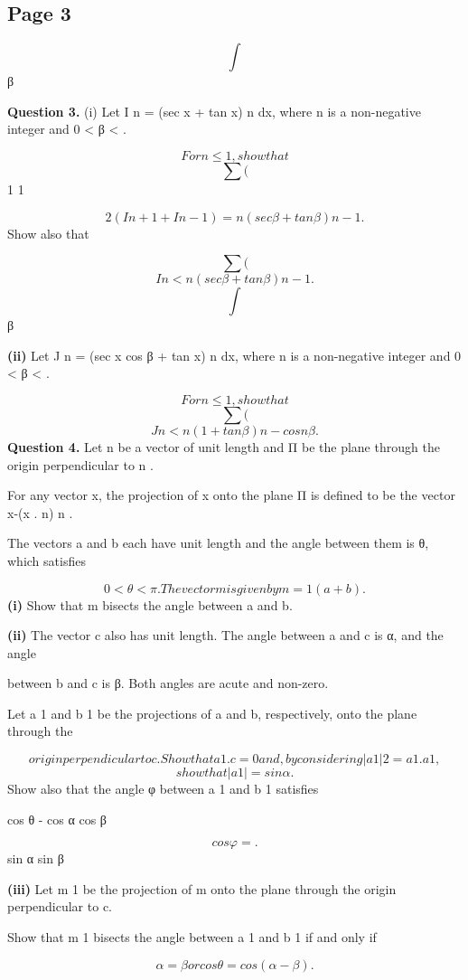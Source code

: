 \documentclass[12pt]{article}
\begin{document}
\subsection*{Page 3}
\begin{flushleft}
\[\int\]
β\par
\bigskip\textbf{Question 3.} (i) Let I n = (sec x + tan x) n dx, where n is a non-negative integer and 0 < β <  .\par
\[For n \leq 1, show that\]
\[\sum (\]
1 1\par
\[2 (I n+1 + I n-1) = n (sec β + tan β) n - 1 .\]
Show also that\par
\[\sum (\]
\[I n < n (sec β + tan β) n - 1 .\]
\[\int\]
β\par
\textbf{(ii)} Let J n = (sec x cos β + tan x) n dx, where n is a non-negative integer and 0 < β <  .\par
\[For n \leq 1, show that\]
\[\sum (\]
\[J n < n (1 + tan β) n - cos n β .\]
\bigskip\textbf{Question 4.} Let n be a vector of unit length and Π be the plane through the origin perpendicular to n .\par
For any vector x, the projection of x onto the plane Π is defined to be the vector x-(x . n) n .\par
The vectors a and b each have unit length and the angle between them is θ, which satisfies\par
\[0 < θ < \pi . The vector m is given by m = 1 (a + b) .\]
\textbf{(i)} Show that m bisects the angle between a and b.\par
\textbf{(ii)} The vector c also has unit length. The angle between a and c is α, and the angle\par
between b and c is β. Both angles are acute and non-zero.\par
Let a 1 and b 1 be the projections of a and b, respectively, onto the plane through the\par
\[origin perpendicular to c. Show that a 1 . c = 0 and, by considering |a 1 |2 = a 1 . a 1,\]
\[show that |a 1 | = sin α.\]
Show also that the angle φ between a 1 and b 1 satisfies\par
cos θ - cos α cos β\par
\[cos φ = .\]
sin α sin β\par
\textbf{(iii)} Let m 1 be the projection of m onto the plane through the origin perpendicular to c.\par
Show that m 1 bisects the angle between a 1 and b 1 if and only if\par
\[α = β or cos θ = cos(α - β).\]
\end{flushleft}
\end{document}
